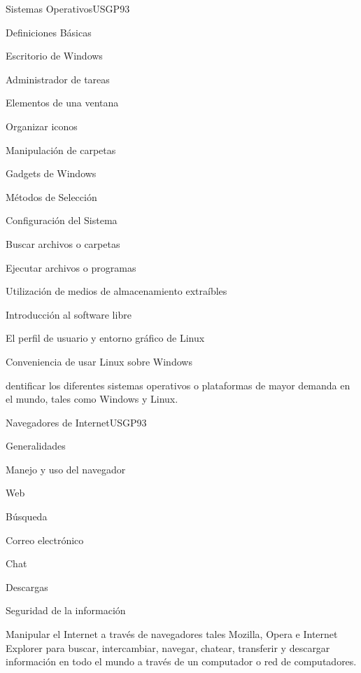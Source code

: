 \begin{syllabus}
\begin{unit}{Sistemas Operativos}{USGP}{9}{3}
\begin{topics}
      \item Definiciones Básicas
      \item Escritorio de Windows
      \item Administrador de tareas
      \item Elementos de una ventana
      \item Organizar iconos
      \item Manipulación de carpetas
      \item Gadgets de Windows 
      \item Métodos de Selección
      \item Configuración del Sistema
      \item Buscar archivos o carpetas
      \item Ejecutar archivos o programas
      \item Utilización de medios de almacenamiento extraíbles
      \item Introducción al software libre
      \item El perfil de usuario y entorno gráfico de Linux
      \item Conveniencia de usar Linux sobre Windows
\end{topics}
\begin{learningoutcomes}
   \item dentificar los diferentes sistemas operativos o plataformas de mayor demanda en el mundo, tales como Windows y Linux.
\end{learningoutcomes}
\end{unit}

\begin{unit}{Navegadores de Internet}{USGP}{9}{3}
\begin{topics}
      \item Generalidades
      \item Manejo y uso del navegador
      \item Web
      \item Búsqueda
      \item Correo electrónico
      \item Chat
      \item Descargas
      \item Seguridad de la información
\end{topics}
\begin{learningoutcomes}
   \item Manipular el Internet a través de navegadores tales Mozilla, Opera e Internet Explorer para buscar, intercambiar, navegar, chatear, transferir y descargar información en todo el mundo a través de un computador o red de computadores.
\end{learningoutcomes}
\end{unit}


\end{syllabus}
